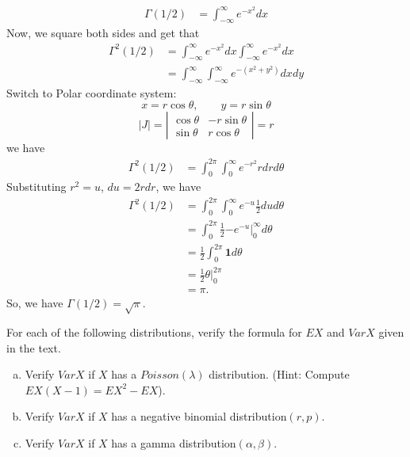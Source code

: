 \documentclass[14pt]{elegantbook}
\begin{document}
\begin{solution}
\begin{enumerate}[(a)]
\begin{align*}
                \Gamma(1/2)&=\int_{-\infty}^{\infty} e^{-x^2}dx
            \end{align*}
            Now, we square both sides and get that 
            \begin{align*}
                \Gamma^2(1/2)&=\int_{-\infty}^{\infty} e^{-x^2}dx\int_{-\infty}^{\infty} e^{-x^2}dx\\
                &=\int_{-\infty}^{\infty}\int_{-\infty}^{\infty} e^{-(x^2+y^2)}dxdy
            \end{align*}
            Switch to Polar coordinate system: \[x=r\cos\theta, \qquad y=r\sin\theta\]
            \[
                |J|=\left|\begin{matrix}
                \cos\theta & -r\sin\theta\\
                \sin\theta & r\cos\theta
            \end{matrix}\right|=r
            \]
            we have
            \begin{align*}
                \Gamma^2(1/2)&=\int_{0}^{2\pi}\int_{0}^{\infty} e^{-r^2}rdrd\theta
            \end{align*}
            Substituting $r^2=u$, $du=2rdr$, we have
            \begin{align*}
                \Gamma^2(1/2)&=\int_{0}^{2\pi}\int_{0}^{\infty} e^{-u}\frac{1}{2}dud\theta\\
                &=\int_{0}^{2\pi}\frac{1}{2}\left.-e^{-u}\right|_0^\infty d\theta\\
                &=\frac{1}{2}\int_{0}^{2\pi}\mathbf{1}d\theta\\
                &=\frac{1}{2}\left.\theta\right|_0^{2\pi}\\
                &=\pi. 
            \end{align*}
            So, we have $\Gamma(1/2)=\sqrt{\pi}$.
        \end{enumerate}
    \end{solution}

    \setcounter{exer}{21}
    \begin{exercise}
        For each of the following distributions, verify the formula for $EX$ and $VarX$ given in the text. 
        \begin{enumerate}[(a)]
            \item Verify $VarX$ if $X$ has a $Poisson(\lambda)$ distribution. (Hint: Compute $EX(X-1)=EX^2-EX$). 
            \item Verify $VarX$ if $X$ has a negative binomial distribution$(r,p)$. 
            \item Verify $VarX$ if $X$ has a gamma distribution$(\alpha, \beta)$. 
        \end{enumerate}
    \end{exercise}
\end{document}
